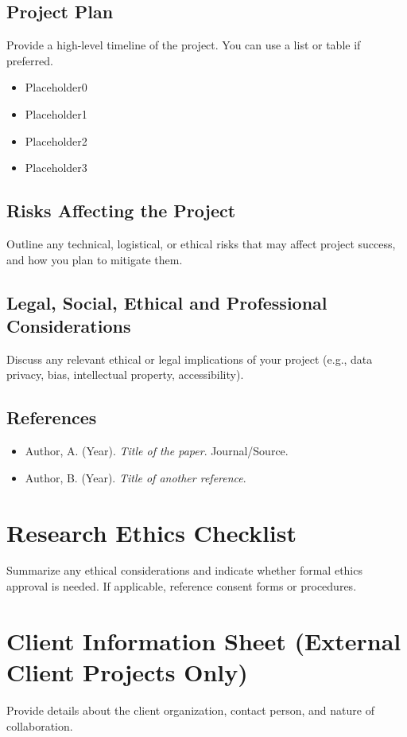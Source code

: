\documentclass[12pt,a4paper]{article}
\begin{document}
\subsection{Project Plan}
Provide a high-level timeline of the project. You can use a list or table if preferred.

\begin{itemize}[noitemsep]
    \item Placeholder0
    \item Placeholder1
    \item Placeholder2
    \item Placeholder3
\end{itemize}

\subsection{Risks Affecting the Project}
Outline any technical, logistical, or ethical risks that may affect project success, and how you plan to mitigate them.

\subsection{Legal, Social, Ethical and Professional Considerations}
Discuss any relevant ethical or legal implications of your project (e.g., data privacy, bias, intellectual property, accessibility).

\subsection{References}
\begin{itemize}[noitemsep]
    \item Author, A. (Year). \textit{Title of the paper}. Journal/Source.
    \item Author, B. (Year). \textit{Title of another reference}.
\end{itemize}

\newpage
\section{Research Ethics Checklist}
Summarize any ethical considerations and indicate whether formal ethics approval is needed. If applicable, reference consent forms or procedures.

\newpage
\section{Client Information Sheet (External Client Projects Only)}
Provide details about the client organization, contact person, and nature of collaboration.
\end{document}
